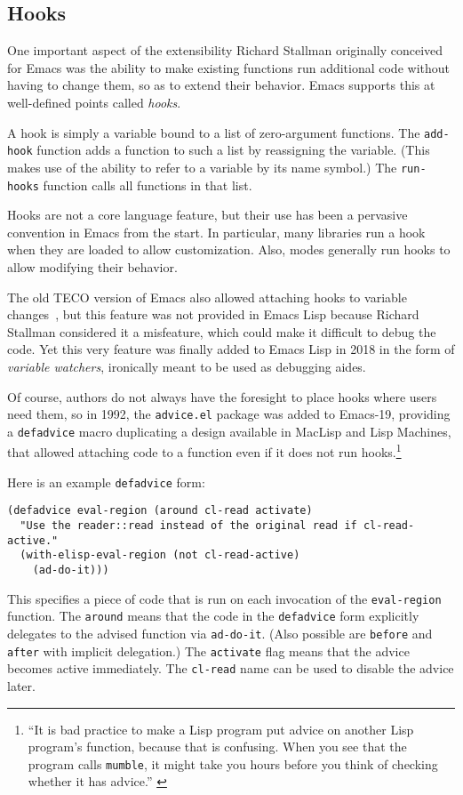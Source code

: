 \documentclass[format=acmsmall, review]{acmart}
\newcommand \Elisp {Emacs Lisp}
\begin{document}
\subsection{Hooks}
\label{sec:hooks}

One important aspect of the extensibility Richard Stallman originally
conceived for Emacs was the ability to make existing functions run
additional code without having to change them, so as to extend their
behavior.  Emacs supports this at well-defined points called
\emph{hooks}.

A hook is simply a variable bound to a list of zero-argument
functions.  The \texttt{add-hook} function adds a function to such a
list by reassigning the variable.  (This makes use of the ability to
refer to a variable by its name symbol.)  The \texttt{run-hooks}
function calls all functions in that list.

Hooks are not a core language feature, but their use has been a
pervasive convention in Emacs from the start.  In particular, many
libraries run a hook when they are loaded to allow customization.
Also, modes generally run hooks to allow modifying their behavior.

The old TECO version of Emacs also allowed attaching hooks to variable
changes~\cite{Stallman1981}, but this feature was not provided in \Elisp{}
because Richard Stallman considered it a misfeature, which could make it
difficult to debug the code.  Yet this very feature was finally added to
\Elisp{} in 2018 in the form of \emph{variable watchers},
ironically meant to be used as debugging aides.

Of course, authors do not always have the foresight to place hooks where
users need them, so in 1992, the \texttt{advice.el} package was added to
Emacs-19, providing a \texttt{defadvice} macro duplicating a design
available in MacLisp and Lisp Machines, that allowed attaching code to
a function even if it does not run hooks.\footnote{``It is bad practice
  to make a Lisp program put advice on another Lisp
  program's function, because that is confusing.  When you see that the
  program calls \texttt{mumble}, it might take you hours before you think of
  checking whether it has advice.'' \cite{Stallman2018-personal}}

Here is an example \texttt{defadvice} form:
%
\begin{verbatim}
(defadvice eval-region (around cl-read activate)
  "Use the reader::read instead of the original read if cl-read-active."
  (with-elisp-eval-region (not cl-read-active)
    (ad-do-it)))
\end{verbatim}
%
This specifies a piece of code that is run on each invocation of the
\texttt{eval-region} function.  The \texttt{around} means that the
code in the \texttt{defadvice} form explicitly delegates to the
advised function via \texttt{ad-do-it}.  (Also possible are
\texttt{before} and \texttt{after} with implicit delegation.)  The
\texttt{activate} flag means that the advice becomes active
immediately.  The \texttt{cl-read} name can be used to disable the
advice later.
\end{document}
